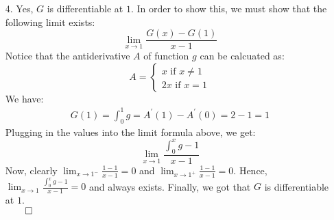 \documentclass[11pt]{article}
\begin{document}
\begin{itemize}
    \item[4.]
        Yes, $G$ is differentiable at $1$. In order to show this, we must show
        that the following limit exists:
        \begin{equation*}
            \lim_{x \to 1} \frac{G(x) - G(1)}{x - 1}
        \end{equation*}
        Notice that the antiderivative $A$ of function $g$ can be calcuated as:
        \begin{equation*}
            A =
            \begin{cases}
                x \text{ if } x \neq 1\\
                2x \text{ if } x = 1
            \end{cases}
        \end{equation*}
        We have:
        \begin{align*}
            G(1) = \int_0^1 g = A^\prime(1) - A^\prime(0) = 2 - 1 = 1
        \end{align*}
        Plugging in the values into the limit formula above, we get:
        \begin{equation*}
            \lim_{x \to 1} \frac{\int_0^x g - 1}{x - 1}
        \end{equation*}
        Now, clearly $\lim_{x \to 1^-} \frac{1 - 1}{x - 1} = 0$ and $\lim_{x
        \to 1^+} \frac{1 - 1}{x - 1} = 0$. Hence, $\lim_{x \to 1}
        \frac{\int_0^x g - 1}{x - 1} = 0$ and always exists. Finally, we got
        that $G$ is differentiable at $1$.\\
        $\qed$


\end{itemize}
\end{document}
